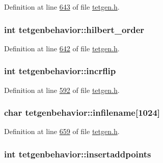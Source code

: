 Definition at line \hyperlink{tetgen_8h_source_l00643}{643} of file \hyperlink{tetgen_8h_source}{tetgen.\+h}.

\subsubsection[{\texorpdfstring{hilbert\+\_\+order}{hilbert_order}}]{\setlength{\rightskip}{0pt plus 5cm}int tetgenbehavior\+::hilbert\+\_\+order}\hypertarget{classtetgenbehavior_a24291eedf8d006b92321d07d466fa19a}{}\label{classtetgenbehavior_a24291eedf8d006b92321d07d466fa19a}


Definition at line \hyperlink{tetgen_8h_source_l00642}{642} of file \hyperlink{tetgen_8h_source}{tetgen.\+h}.

\subsubsection[{\texorpdfstring{incrflip}{incrflip}}]{\setlength{\rightskip}{0pt plus 5cm}int tetgenbehavior\+::incrflip}\hypertarget{classtetgenbehavior_a340fcbca73520d6cbd33cc5ef113554d}{}\label{classtetgenbehavior_a340fcbca73520d6cbd33cc5ef113554d}


Definition at line \hyperlink{tetgen_8h_source_l00592}{592} of file \hyperlink{tetgen_8h_source}{tetgen.\+h}.

\subsubsection[{\texorpdfstring{infilename}{infilename}}]{\setlength{\rightskip}{0pt plus 5cm}char tetgenbehavior\+::infilename\mbox{[}1024\mbox{]}}\hypertarget{classtetgenbehavior_ac879f6843038d5428199079c515ce6e6}{}\label{classtetgenbehavior_ac879f6843038d5428199079c515ce6e6}


Definition at line \hyperlink{tetgen_8h_source_l00659}{659} of file \hyperlink{tetgen_8h_source}{tetgen.\+h}.

\subsubsection[{\texorpdfstring{insertaddpoints}{insertaddpoints}}]{\setlength{\rightskip}{0pt plus 5cm}int tetgenbehavior\+::insertaddpoints}\hypertarget{classtetgenbehavior_a663e7008fca88d61ff34f01716c98da8}{}\label{classtetgenbehavior_a663e7008fca88d61ff34f01716c98da8}


